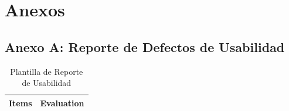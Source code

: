 \documentclass[stu, 12pt, letterpaper, donotrepeattitle, floatsintext, natbib]{apa7}
\begin{document}
\newpage
\section{\large Anexos}

\subsection{Anexo A: Reporte de Defectos de Usabilidad}

\begin{longtable}{|>{\raggedright\arraybackslash}p{10cm}|>{\centering\arraybackslash}p{3cm}|}
    \caption{Plantilla de Reporte de Usabilidad} \label{tab:reporte_usabilidad} \\
    \hline
    \textbf{Items} & \textbf{Evaluation} \\ \hline
    

\end{longtable}
\end{document}
